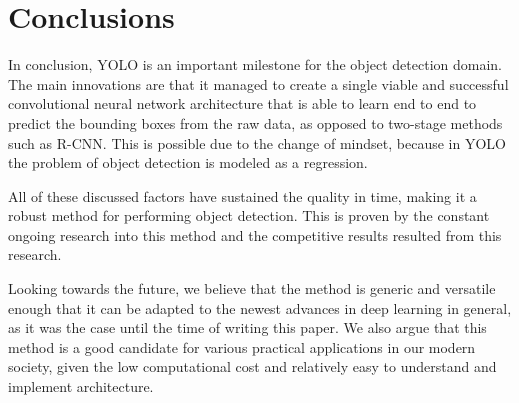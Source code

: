 \section{Conclusions}
    In conclusion, YOLO is an important milestone for the object detection domain. The main innovations are that it managed to create a single viable and successful convolutional neural network architecture that is able to learn end to end to predict the bounding boxes from the raw data, as opposed to two-stage methods such as R-CNN. This is possible due to the change of mindset, because in YOLO the problem of object detection is modeled as a regression.
    
    All of these discussed factors have sustained the quality in time, making it a robust method for performing object detection. This is proven by the constant ongoing research into this method and the competitive results resulted from this research. 
    
    Looking towards the future, we believe that the method is generic and versatile enough that it can be adapted to the newest advances in deep learning in general, as it was the case until the time of writing this paper. We also argue that this method is a good candidate for various practical applications in our modern society, given the low computational cost and relatively easy to understand and implement architecture.
    
        